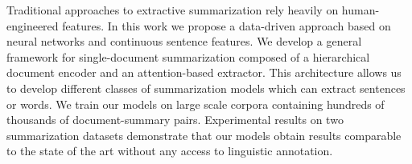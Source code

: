 Traditional approaches to extractive summarization rely heavily on human-engineered features. In this work we propose a data-driven approach based on neural networks and continuous sentence features. We develop a general framework for single-document summarization composed of a hierarchical document encoder and an attention-based extractor. This architecture allows us to develop different classes of summarization models which can extract sentences or words. We train our models on large scale corpora containing hundreds of thousands of document-summary pairs. Experimental results on two summarization datasets demonstrate that our models obtain results comparable to the state of the art without any access to linguistic annotation.

